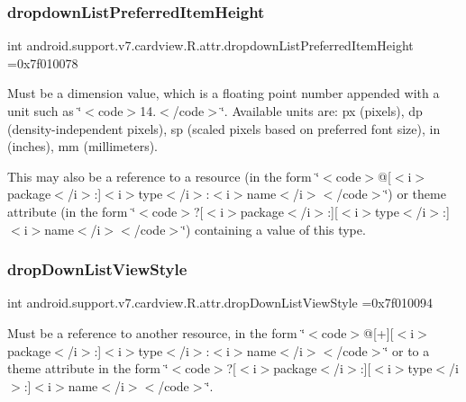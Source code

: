 \subsubsection{\texorpdfstring{dropdown\+List\+Preferred\+Item\+Height}{dropdownListPreferredItemHeight}}
{\footnotesize\ttfamily int android.\+support.\+v7.\+cardview.\+R.\+attr.\+dropdown\+List\+Preferred\+Item\+Height =0x7f010078\hspace{0.3cm}{\ttfamily [static]}}

Must be a dimension value, which is a floating point number appended with a unit such as \char`\"{}$<$code$>$14.\+5sp$<$/code$>$\char`\"{}. Available units are\+: px (pixels), dp (density-\/independent pixels), sp (scaled pixels based on preferred font size), in (inches), mm (millimeters). 

This may also be a reference to a resource (in the form \char`\"{}$<$code$>$@\mbox{[}$<$i$>$package$<$/i$>$\+:\mbox{]}$<$i$>$type$<$/i$>$\+:$<$i$>$name$<$/i$>$$<$/code$>$\char`\"{}) or theme attribute (in the form \char`\"{}$<$code$>$?\mbox{[}$<$i$>$package$<$/i$>$\+:\mbox{]}\mbox{[}$<$i$>$type$<$/i$>$\+:\mbox{]}$<$i$>$name$<$/i$>$$<$/code$>$\char`\"{}) containing a value of this type. \mbox{\label{classandroid_1_1support_1_1v7_1_1cardview_1_1R_1_1attr_a0ebf51c52ff5aa7a4447b55246bd588d}} 
\subsubsection{\texorpdfstring{drop\+Down\+List\+View\+Style}{dropDownListViewStyle}}
{\footnotesize\ttfamily int android.\+support.\+v7.\+cardview.\+R.\+attr.\+drop\+Down\+List\+View\+Style =0x7f010094\hspace{0.3cm}{\ttfamily [static]}}

Must be a reference to another resource, in the form \char`\"{}$<$code$>$@\mbox{[}+\mbox{]}\mbox{[}$<$i$>$package$<$/i$>$\+:\mbox{]}$<$i$>$type$<$/i$>$\+:$<$i$>$name$<$/i$>$$<$/code$>$\char`\"{} or to a theme attribute in the form \char`\"{}$<$code$>$?\mbox{[}$<$i$>$package$<$/i$>$\+:\mbox{]}\mbox{[}$<$i$>$type$<$/i$>$\+:\mbox{]}$<$i$>$name$<$/i$>$$<$/code$>$\char`\"{}. \mbox{\label{classandroid_1_1support_1_1v7_1_1cardview_1_1R_1_1attr_a2a236b6fb939f8b88f2240c34a13b959}} 
